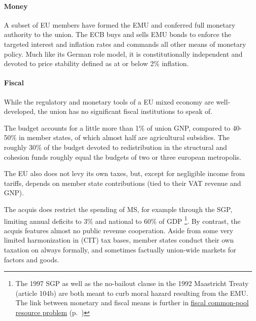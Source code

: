 \documentclass[11pt,a4paper,oneside]{article}
\begin{document}
\paragraph{Money} A subset of \gls{EU} members have formed the \gls{EMU} and conferred full monetary authority to the union. 
The \gls{ECB} buys and sells \gls{EMU} bonds to enforce the targeted interest and inflation rates and commands all other means of monetary policy. 
Much like its German role model, it is constitutionally independent and devoted to price stability defined as at or below 2\% inflation. %

\paragraph{Fiscal} While the regulatory and monetary tools of a \gls{EU} mixed economy are well-developed, the union has no significant fiscal institutions to speak of. 


The budget accounts for a little more than 1\% of union \gls{GNP}, compared to 40-50\% in member states, of which almost half are agricultural subsidies. 
The roughly 30\% of the budget devoted to redistribution in the structural and cohesion funds roughly equal the budgets of two or three european metropolis. %

The \gls{EU} also does not levy its own taxes, but, except for negligible income from tariffs, depends on member state contributions (tied to their \gls{VAT} revenue and \gls{GNP}). 

The acquis does restrict the spending of \gls{MS}, for example through the \gls{SGP}, limiting annual deficits to 3\% and national to 60\% of \gls{GDP}
	\footnote{
		The 1997 \gls{SGP} as well as the no-bailout clause in the 1992 Maastricht Treaty (article 104b) are both meant to curb moral hazard resulting from the \gls{EMU}. 
		The link between monetary and fiscal means is further in \hyperref[sec:fiscal-CPR]{fiscal common-pool resource problem} (p.~\pageref{sec:fiscal-CPR})
	}.%
By contrast, the acquis features almost no public revenue cooperation. 
Aside from some very limited harmonization in (\gls{CIT}) tax bases, member states conduct their own taxation on always formally, and sometimes factually union-wide markets for factors and goods.
\end{document}
